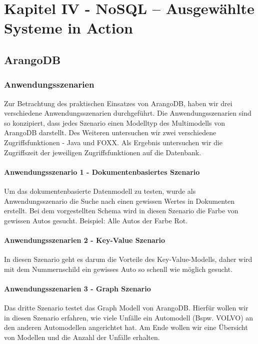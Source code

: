 \chapter{Kapitel IV - NoSQL – Ausgewählte Systeme in Action}
\section{ArangoDB}
\subsection{Anwendungsszenarien}
Zur Betrachtung des praktischen Einsatzes von ArangoDB, haben wir drei verschiedene Anwendungsszenarien durchgeführt. Die Anwendungsszenarien sind so konzipiert, dass jedes Szenario einen Modelltyp des Multimodells von ArangoDB darstellt. Des Weiteren untersuchen wir zwei verschiedene Zugriffsfunktionen - Java und FOXX. Als Ergebnis untersuchen wir die Zugriffszeit der jeweiligen Zugriffsfunktionen auf die Datenbank.
\subsubsection{Anwendungsszenario 1 - Dokumentenbasiertes Szenario}
Um das dokumentenbasierte Datenmodell zu testen, wurde als Anwendungsszenario die Suche nach einen gewissen Wertes in Dokumenten erstellt. Bei dem vorgestellten Schema wird in diesen Szenario die Farbe von gewissen Autos gesucht. Beispiel: Alle Autos der Farbe Rot.
\subsubsection{Anwendungsszenarien 2 - Key-Value Szenario}
In diesen Szenario geht es darum die Vorteile des Key-Value-Modells, daher wird mit dem Nummernschild ein gewisses Auto so schenll wie möglich gesucht.
\subsubsection{Anwendungsszenarien 3 - Graph Szenario}
Das dritte Szenario testet das Graph Modell von ArangoDB. Hierfür wollen wir in diesen Szenario erfahren, wie viele Unfälle ein Automodell (Bspw. VOLVO) an den anderen Automodellen angerichtet hat. Am Ende wollen wir eine Übersicht von Modellen und die Anzahl der Unfälle erhalten.


